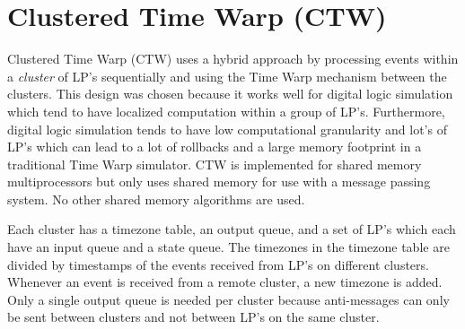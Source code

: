 \documentclass[11pt]{book}
\begin{document}


\section{Clustered Time Warp (CTW)}

Clustered Time Warp\cite{avril-95} (CTW) uses a hybrid approach by processing events within
a \emph{cluster} of LP's sequentially and using the Time Warp mechanism between the clusters.
This design was chosen because it works well for digital logic simulation which tend to have
localized computation within a group of LP's. Furthermore, digital logic simulation tends to
have low computational granularity and lot's of LP's which can lead to a lot of rollbacks
and a large memory footprint in a traditional Time Warp simulator. CTW is implemented for
shared memory multiprocessors but only uses shared memory for use with a message passing
system. No other shared memory algorithms are used.

Each cluster has a timezone table, an output queue, and a set of LP's which each have an
input queue and a state queue. The timezones in the timezone table are divided by timestamps
of the events received from LP's on different clusters. Whenever an event is received from
a remote cluster, a new timezone is added. Only a single output queue is needed per cluster
because anti-messages can only be sent between clusters and not between LP's on the same
cluster.
\end{document}
